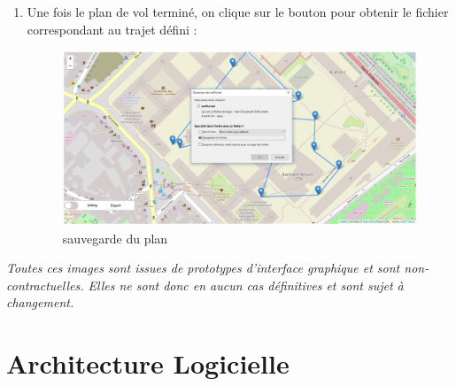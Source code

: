 \documentclass{article}
\begin{document}
\begin{enumerate}
  	\item Une fois le plan de vol terminé, on clique sur le bouton pour obtenir le fichier correspondant au trajet défini :\\
  	\begin{figure}[!h]
 	\begin{center}
 	\includegraphics[scale=0.42]{capt8.PNG}
 	\caption{sauvegarde du plan}
 	\end{center}
 	\end{figure}
 	\end{enumerate}
	\textit{Toutes ces images sont issues de prototypes d'interface graphique et sont non-contractuelles. Elles ne sont donc en aucun cas définitives et sont sujet à changement.}
	
    
        
	\newpage
\section{Architecture Logicielle}
\end{document}
